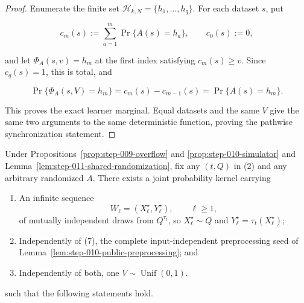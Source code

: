 \begin{proof}
Enumerate the finite set
\(\mathcal H_{k,N}=\{h_1,\ldots,h_q\}\). For each dataset \(s\), put

\[
  c_m(s):=\sum_{a=1}^m\Pr\{A(s)=h_a\},\qquad c_0(s):=0,
\]

and let \(\Phi_A(s,v)=h_m\) at the first index satisfying
\(c_m(s)\ge v\). Since \(c_q(s)=1\), this is total, and

\[
  \Pr\{\Phi_A(s,V)=h_m\}=c_m(s)-c_{m-1}(s)
  =\Pr\{A(s)=h_m\}.
\]

This proves the exact learner marginal. Equal datasets and the same \(V\)
give the same two arguments to the same deterministic function, proving
the pathwise synchronization statement. \end{proof}

\begin{lemma}\label{lem:step-011-coupling-kernel}
Under Propositions~\ref{prop:step-009-overflow} and
\ref{prop:step-010-simulator} and
Lemma~\ref{lem:step-011-shared-randomization}, fix any \((t,Q)\) in (2)
and any arbitrary randomized \(A\). There exists a joint probability
kernel carrying

\begin{enumerate}
\item An infinite sequence
   \[
     W_\ell=(X_\ell^\star,Y_\ell^\star),\qquad \ell\ge1,
   \tag{7}
   \]
   of mutually independent draws from \(Q^{\tau_t}\), so
   \(X_\ell^\star\sim Q\) and
   \(Y_\ell^\star=\tau_t(X_\ell^\star)\);
\item Independently of (7), the complete input-independent preprocessing seed
   of Lemma~\ref{lem:step-010-public-preprocessing}; and
\item Independently of both, one \(V\sim\operatorname{Unif}(0,1)\).
\end{enumerate}

such that the following statements hold.


\end{lemma}
